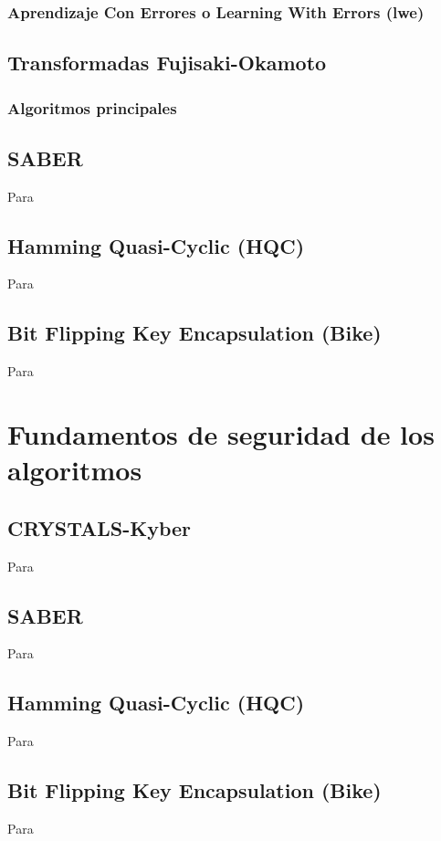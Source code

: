 \subsubsection{Aprendizaje Con Errores o Learning With Errors (\gls{lwe})}
\cite{LWElearning}
\subsection{Transformadas Fujisaki-Okamoto}
\cite{Fujisaki1999}
\subsubsection{Algoritmos principales}
\newpage
\subsection{SABER}
Para \cite{saber-spec-2020}
\subsection{Hamming Quasi-Cyclic (HQC)}
Para  \cite{hqc-spec-2022}
\subsection{Bit Flipping Key Encapsulation (Bike)}
Para \cite{bike-spec-2022}
\newpage
\section{Fundamentos de seguridad de los algoritmos}
\subsection{CRYSTALS-Kyber }
Para \cite{kyber-spec-2021}
\subsection{SABER}
Para \cite{saber-spec-2020}
\subsection{Hamming Quasi-Cyclic (HQC)}
Para  \cite{hqc-spec-2022}
\subsection{Bit Flipping Key Encapsulation (Bike)}
Para \cite{bike-spec-2022}